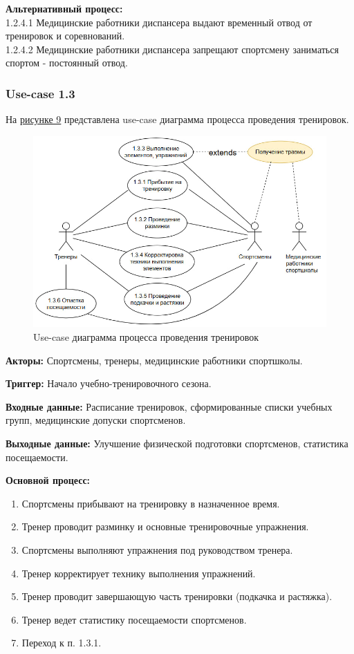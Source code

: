 \documentclass[12pt,a4paper,final]{article} %
\begin{document}
\par \textbf{Альтернативный процесс:} \\
1.2.4.1 Медицинские работники диспансера выдают временный отвод от тренировок и соревнований. \\
1.2.4.2 Медицинские работники диспансера запрещают спортсмену заниматься спортом - постоянный отвод.

\subsubsection{Use-case 1.3}
\par На \hyperref[fig:im9]{рисунке 9} представлена use-case диаграмма процесса проведения тренировок. 
\begin{figure}[h!]
	\centering
	\includegraphics[width=1.0\linewidth]{images/6}
	\caption{Use-case диаграмма процесса проведения тренировок}
	\label{fig:im9}
\end{figure}	
\par \textbf{Акторы:} Спортсмены, тренеры, медицинские работники спортшколы.
\par \textbf{Триггер:} Начало учебно-тренировочного сезона.
\par \textbf{Входные данные:} Расписание тренировок, сформированные списки учебных групп, медицинские допуски спортсменов.
\par \textbf{Выходные данные:} Улучшение физической подготовки спортсменов, статистика посещаемости.

\newpage
\par \textbf{Основной процесс:}
\begin{enumerate}[nosep, label=1.3.\arabic*]
	\item Спортсмены прибывают на тренировку в назначенное время.
	\item Тренер проводит разминку и основные тренировочные упражнения.
	\item Спортсмены выполняют упражнения под руководством тренера.
	\item Тренер корректирует технику выполнения упражнений.
	\item Тренер проводит завершающую часть тренировки (подкачка и растяжка).
	\item Тренер ведет статистику посещаемости спортсменов.
	\item Переход к п. 1.3.1.
\end{enumerate}
\end{document}
